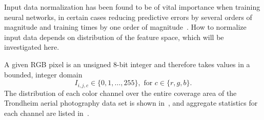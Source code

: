 Input data normalization has been found to be of vital importance when training neural networks, in certain cases reducing predictive errors by several orders of magnitude and training times by one order of magnitude~\cite{input_normalization_1997}.
How to normalize input data depends on distribution of the feature space, which will be investigated here.


A given RGB pixel is an unsigned 8-bit integer and therefore takes values in a bounded, integer domain
%
\begin{equation*}
  I_{i,j,c} \in \{0, 1, \ldots, 255\}, \text{ for } c \in \{r, g, b\}.
\end{equation*}
%
The distribution of each color channel over the entire coverage area of the Trondheim aerial photography data set is shown in~, and aggregate statistics for each channel are listed in~.

\begin{figure}[H]
  \begin{floatrow}
  \end{floatrow}
\end{figure}

